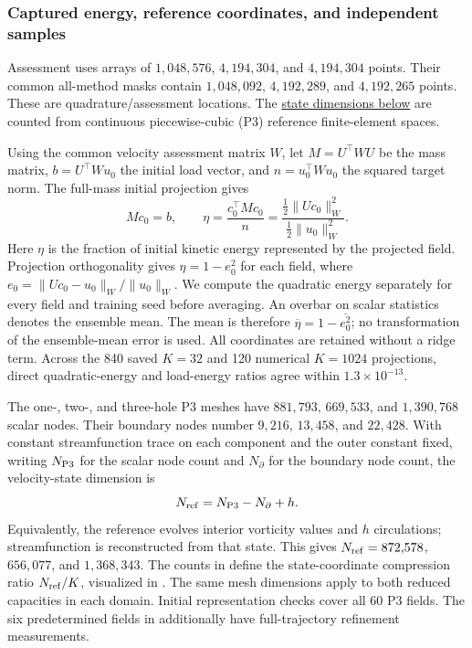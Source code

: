 \subsubsection{Captured energy, reference coordinates, and independent samples}
Assessment uses arrays of $1{,}048{,}576$, $4{,}194{,}304$, and $4{,}194{,}304$ points. Their common all-method masks contain $1{,}048{,}092$, $4{,}192{,}289$, and $4{,}192{,}265$ points. These are quadrature/assessment locations. The \hyperref[tab:random-historical-capacity]{state dimensions below} are counted from continuous piecewise-cubic (P3) reference finite-element spaces.

Using the common velocity assessment matrix $W$, let $M=U^{\top}WU$ be the mass matrix, $b=U^{\top}Wu_0$ the initial load vector, and $n=u_0^{\top}Wu_0$ the squared target norm. The full-mass initial projection gives
\begin{equation}
Mc_0=b,\qquad
\eta=\frac{c_0^{\top}Mc_0}{n}=\frac{\tfrac12\|Uc_0\|_W^2}{\tfrac12\|u_0\|_W^2}.
\end{equation}
Here $\eta$ is the fraction of initial kinetic energy represented by the projected field. Projection orthogonality gives $\eta=1-e_0^2$ for each field, where $e_0=\|Uc_0-u_0\|_W/\|u_0\|_W$. We compute the quadratic energy separately for every field and training seed before averaging. An overbar on scalar statistics denotes the ensemble mean. The mean is therefore $\overline\eta=1-\overline{e_0^2}$; no transformation of the ensemble-mean error is used. All coordinates are retained without a ridge term. Across the 840 saved $K=32$ and 120 numerical $K=1024$ projections, direct quadratic-energy and load-energy ratios agree within $1.3\times10^{-13}$.

The one-, two-, and three-hole P3 meshes have $881{,}793$, $669{,}533$, and $1{,}390{,}768$ scalar nodes. Their boundary nodes number $9{,}216$, $13{,}458$, and $22{,}428$. With constant streamfunction trace on each component and the outer constant fixed, writing $N_{\rm P3}$ for the scalar node count and $N_\partial$ for the boundary node count, the velocity-state dimension is
\begin{equation}
N_{\rm ref}=N_{\rm P3}-N_{\partial}+h.
\end{equation}
Equivalently, the reference evolves interior vorticity values and $h$ circulations; streamfunction is reconstructed from that state. This gives $N_{\rm ref}=872{,}578$, $656{,}077$, and $1{,}368{,}343$. The counts in  define the state-coordinate compression ratio $N_{\rm ref}/K$, visualized in . The same mesh dimensions apply to both reduced capacities in each domain. Initial representation checks cover all 60 P3 fields. The six predetermined fields in  additionally have full-trajectory refinement measurements.

